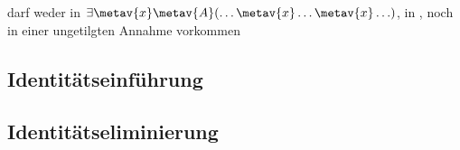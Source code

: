 \begin{multicols}{2}
\begin{fitchproof}
	\open	
	\close
\end{fitchproof}

\medskip%
\noindent {} darf weder in $\exists \metav{x}\metav{A}(\ldots \metav{x} \ldots \metav{x}\ldots)$, in , noch in einer ungetilgten Annahme vorkommen
\vfill\columnbreak

\end{multicols}

\subsection*{Identitätseinführung}

\begin{fitchproof}
	 
\end{fitchproof}


\subsection*{Identitätseliminierung}

\begin{multicols}{2}
\begin{fitchproof}
	 
\end{fitchproof}
\begin{fitchproof}
	 
\end{fitchproof}
\end{multicols}

